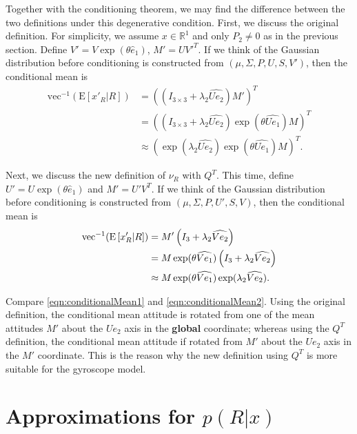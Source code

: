 \documentclass[10pt,twocolumn]{article}
\newcommand{\expect}[1]{\ensuremath{\mathrm{E}\left[ #1 \right]}}
\newcommand{\real}[1]{\ensuremath{\mathbb{R}^{ #1 }}}
\begin{document}
Together with the conditioning theorem, we may find the difference between the two definitions under this degenerative condition.
First, we discuss the original definition.
For simplicity, we assume $x\in\real{1}$ and only $P_2 \neq 0$ as in the previous section.
Define $V'=V\exp(\theta\hat{e}_1)$, $M'=UV'^T$.
If we think of the Gaussian distribution before conditioning is constructed from $(\mu,\Sigma,P,U,S,V')$, then the conditional mean is
\begin{align} \label{eqn:conditionalMean1}
	\mathrm{vec}^{-1}(\expect{x'_R \lvert R}) &= \left( \left( I_{3\times 3} + \lambda_2\widehat{Ue_2} \right)M' \right)^T \nonumber \\
	&= \left( \left( I_{3\times 3} + \lambda_2\widehat{Ue_2} \right) \exp(\theta\widehat{Ue_1})M \right)^T \nonumber \\
	&\approx \left( \exp(\lambda_2\widehat{Ue_2})\exp(\theta\widehat{Ue_1})M \right)^T.
\end{align}

Next, we discuss the new definition of $\nu_R$ with $Q^T$.
This time, define $U' = U\exp(\theta\hat{e}_1)$ and $M'=U'V^T$.
If we think of the Gaussian distribution before conditioning is constructed from $(\mu,\Sigma,P,U',S,V)$, then the conditional mean is
\begin{align} \label{eqn:conditionalMean2}
	\mathrm{vec}^{-1}(\expect{x'_R \lvert R}) &= M'\left( I_{3\time 3} + \lambda_2\widehat{Ve_2} \right) \nonumber \\
	&= M\exp(\theta\widehat{Ve_1})\left( I_{3\time 3} + \lambda_2\widehat{Ve_2} \right) \nonumber \\
	&\approx M\exp(\theta\widehat{Ve_1})\exp(\lambda_2\widehat{Ve_2}).
\end{align}

Compare \eqref{eqn:conditionalMean1} and \eqref{eqn:conditionalMean2}.
Using the original definition, the conditional mean attitude is rotated from one of the mean attitudes $M'$ about the $Ue_2$ axis in the \textbf{global} coordinate;
whereas using the $Q^T$ definition, the conditional mean attitude if rotated from $M'$ about the $Ue_2$ axis in the $M'$ coordinate.
This is the reason why the new definition using $Q^T$ is more suitable for the gyroscope model.

\section{Approximations for $p(R|x)$}
\end{document}

